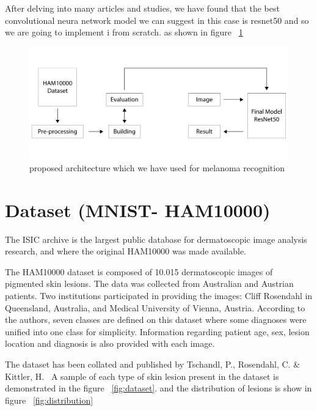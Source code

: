     After delving into many articles and studies, we have found that the best convolutional neura network model we can suggest in this case is resnet50 and so we are going to implement i from scratch. as shown in figure ~\ref{fig:architecture}

    \begin{figure}[htbp]
    \begin{center}
    \includegraphics[width=15cm]{./chapter-05-our-contribution/3.png}
    \end{center}
    \caption{proposed architecture which we have used for melanoma recognition}
    \label{fig:architecture}
    \end{figure}

\section{Dataset (MNIST- HAM10000)}

    The ISIC archive is the largest public database for dermatoscopic image analysis research, and where the original HAM10000 was made available.~\cite{JULIANA2021}

    The HAM10000 dataset is composed of 10.015 dermatoscopic images of pigmented skin lesions. The data was collected from Australian and Austrian patients. Two institutions participated in providing the images: Cliff Rosendahl in Queensland, Australia, and Medical University of Vienna, Austria. According to the authors, seven classes are defined on this dataset where some diagnoses were unified into one class for simplicity. Information regarding patient age, sex, lesion location and diagnosis is also provided with each image. ~\cite{JULIANA2021}


    The dataset has been collated and published by Tschandl, P., Rosendahl, C. \& Kittler, H.~\cite{JULIANA2021} A sample of each type of skin lesion present in the dataset is demonstrated in the figure ~\ref{fig:dataset}. and the distribution of lesions is show in figure ~\ref{fig:distribution}

